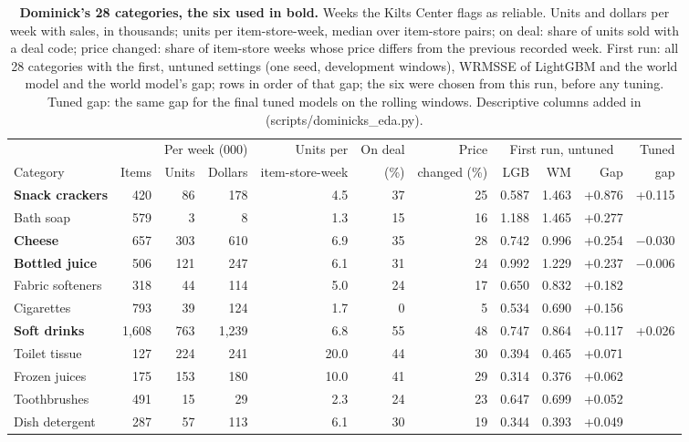 \begin{table}[t]
\centering
\caption{\textbf{Dominick's 28 categories, the six used in bold.} Weeks the Kilts Center flags as reliable. Units and
dollars per week with sales, in thousands; units per item-store-week, median over item-store pairs; on deal: share of
units sold with a deal code; price changed: share of item-store weeks whose price differs from the previous recorded
week. First run: all 28 categories with the first, untuned settings (one seed, development windows), WRMSSE of LightGBM
and the world model and the world model's gap; rows in order of that gap; the six were chosen from this run, before
any tuning. Tuned gap: the same gap for the final tuned models on the rolling windows. Descriptive columns added in
\thisrev{} (scripts/dominicks\_eda.py).}
\label{tab:domcats}
\footnotesize\setlength{\tabcolsep}{4pt}
\begin{tabular}{lrrrrrrrrrr}
\toprule
 & & \multicolumn{2}{c}{Per week (000)} & Units per & On deal & Price & \multicolumn{3}{c}{First run, untuned} & Tuned \\
\cmidrule(lr){3-4}\cmidrule(lr){8-10}
Category & Items & Units & Dollars & item-store-week & (\%) & changed (\%) & LGB & WM & Gap & gap \\
\midrule
\textbf{Snack crackers} & 420 & 86 & 178 & 4.5 & 37 & 25 & 0.587 & 1.463 & +0.876 & +0.115 \\
Bath soap & 579 & 3 & 8 & 1.3 & 15 & 16 & 1.188 & 1.465 & +0.277 &  \\
\textbf{Cheese} & 657 & 303 & 610 & 6.9 & 35 & 28 & 0.742 & 0.996 & +0.254 & $-$0.030 \\
\textbf{Bottled juice} & 506 & 121 & 247 & 6.1 & 31 & 24 & 0.992 & 1.229 & +0.237 & $-$0.006 \\
Fabric softeners & 318 & 44 & 114 & 5.0 & 24 & 17 & 0.650 & 0.832 & +0.182 &  \\
Cigarettes & 793 & 39 & 124 & 1.7 & 0 & 5 & 0.534 & 0.690 & +0.156 &  \\
\textbf{Soft drinks} & 1,608 & 763 & 1,239 & 6.8 & 55 & 48 & 0.747 & 0.864 & +0.117 & +0.026 \\
Toilet tissue & 127 & 224 & 241 & 20.0 & 44 & 30 & 0.394 & 0.465 & +0.071 &  \\
Frozen juices & 175 & 153 & 180 & 10.0 & 41 & 29 & 0.314 & 0.376 & +0.062 &  \\
Toothbrushes & 491 & 15 & 29 & 2.3 & 24 & 23 & 0.647 & 0.699 & +0.052 &  \\
Dish detergent & 287 & 57 & 113 & 6.1 & 30 & 19 & 0.344 & 0.393 & +0.049 &  \\

\end{tabular}
\end{table}
